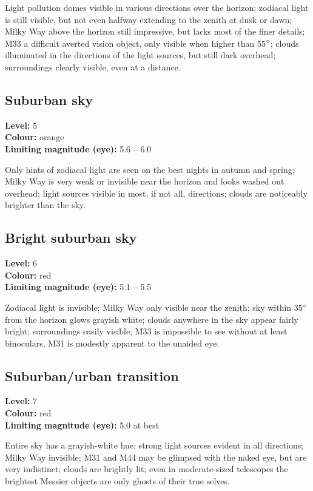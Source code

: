 Light pollution domes visible in various directions over the horizon; zodiacal light is still visible, but not even halfway extending to the zenith at dusk or dawn; Milky Way above the horizon still impressive, but lacks most of the finer details; M33 a difficult averted vision object, only visible when higher than 55$\degree$; clouds illuminated in the directions of the light sources, but still dark overhead; surroundings clearly visible, even at a distance.

\subsection{Suburban sky}
\textbf{Level:} 5 \\
\textbf{Colour:} orange \\
\textbf{Limiting magnitude (eye):} 5.6 -- 6.0

Only hints of zodiacal light are seen on the best nights in autumn and spring; Milky Way is very weak or invisible near the horizon and looks washed out overhead; light sources visible in most, if not all, directions; clouds are noticeably brighter than the sky.

\subsection{Bright suburban sky}
\textbf{Level:} 6 \\
\textbf{Colour:} red \\
\textbf{Limiting magnitude (eye):} 5.1 -- 5.5

Zodiacal light is invisible; Milky Way only visible near the zenith; sky within 35$\degree$ from the horizon glows grayish white; clouds anywhere in the sky appear fairly bright; surroundings easily visible; M33 is impossible to see
without at least binoculars, M31 is modestly apparent to the unaided eye.

\subsection{Suburban/urban transition}
\textbf{Level:} 7 \\
\textbf{Colour:} red \\
\textbf{Limiting magnitude (eye):} 5.0 at best

Entire sky has a grayish-white hue; strong light sources evident in all directions; Milky Way invisible; M31 and M44 may be glimpsed with the naked eye, but are very indistinct; clouds are brightly lit; even in moderate-sized telescopes the brightest Messier objects are only ghosts of their true selves.

